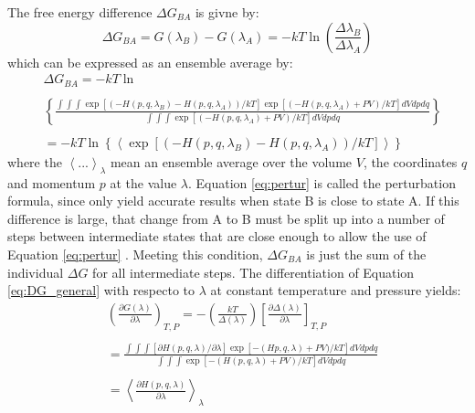 The free energy difference $\Delta G_{BA}$ is givne by: 
\begin{equation}
    \Delta G_{BA}= G(\lambda_B) - G(\lambda_A) = -kT\ln{\left ( \frac{\Delta \lambda_B}{\Delta \lambda_A} \right )}
\end{equation}
which can be expressed as an ensemble average by:
\begin{equation}
    \begin{split}
       &\Delta G_{BA} =-kT\ln\\\\
       &{\left \{ \frac{\int\int\int\exp{[(-H(p,q,\lambda_B)-H(p,q,\lambda_A))/kT]}\exp{[(-H(p,q,\lambda_A)+PV)/kT]}dVdpdq} {\int\int\int\exp{[(-H(p,q,\lambda_A)+PV)/kT]}dVdpdq} \right \}}\\\\
       &=-kT\ln{\left \{  \left \langle \exp{[(-H(p,q,\lambda_B)-H(p,q,\lambda_A))/kT]} \right \rangle \right \}}
    \end{split}
\label{eq:pertur}
\end{equation}
where the $\left \langle ... \right \rangle_\lambda$ mean an ensemble average over the volume $V$, the coordinates $q$ and momentum $p$ at the value $\lambda$. Equation \ref{eq:pertur} is called the perturbation formula, since only yield accurate results when state B is close to state A. If this difference is large, that change from A to B must be split up into a number of steps between intermediate states that are close enough to allow the use of Equation \ref{eq:pertur} \cite{van1988role}. Meeting this condition, $\Delta G_{BA}$ is just the sum of the individual $\Delta G$ for all intermediate steps. The differentiation of Equation \ref{eq:DG_general} with respecto to $\lambda$ at constant temperature and pressure yields:
\begin{equation}
    \begin{split}
        &\left ( \frac{\partial G(\lambda)}{\partial \lambda} \right )_{T,P}=-\left ( \frac{kT}{\Delta (\lambda)} \right ) \left [ \frac{\partial \Delta (\lambda)}{\partial \lambda} \right ]_{T,P} \\\\
        &=\frac{\int\int\int[\partial H(p,q,\lambda)/\partial \lambda] \exp{[-(Hp,q,\lambda)+PV)/kT] dV dp dq}}{\int\int\int\exp{[-(H(p,q,\lambda)+PV)/kT]dV dp dq}}\\\\
        &=\left \langle \frac{\partial H(p,q,\lambda)}{\partial \lambda} \right \rangle_\lambda
    \end{split}
\end{equation}
